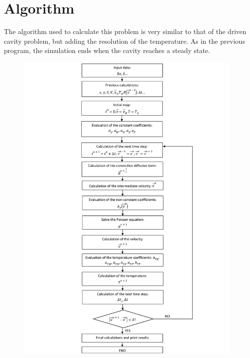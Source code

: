 \section{Algorithm}
The algorithm used to calculate this problem is very similar to that of the driven cavity problem, but adding the resolution of the temperature. As in the previous program, the simulation ends when the cavity reaches a steady state.
\begin{figure}[H]
	\includegraphics[scale=0.185]{Buoyancy/Doc4}
\end{figure}

